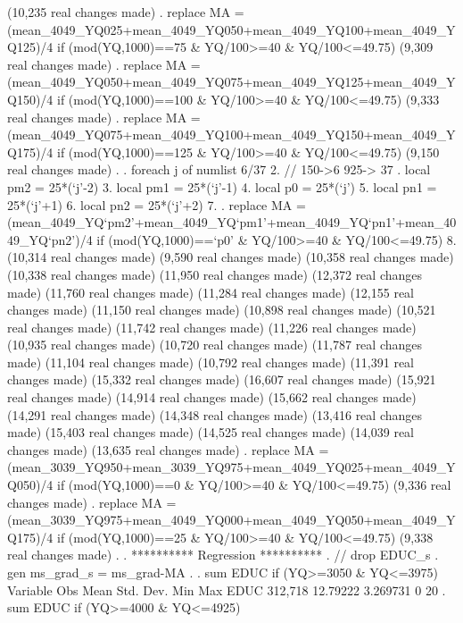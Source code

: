 (10,235 real changes made)
{\smallskip}
. replace MA = (mean_4049_YQ025+mean_4049_YQ050+mean_4049_YQ100+mean_4049_YQ125)/4 if (mod(YQ,1000)==75 \& YQ/100>=40 \& YQ/100<=49.75)
(9,309 real changes made)
{\smallskip}
. replace MA = (mean_4049_YQ050+mean_4049_YQ075+mean_4049_YQ125+mean_4049_YQ150)/4 if (mod(YQ,1000)==100 \& YQ/100>=40 \& YQ/100<=49.75)
(9,333 real changes made)
{\smallskip}
. replace MA = (mean_4049_YQ075+mean_4049_YQ100+mean_4049_YQ150+mean_4049_YQ175)/4 if (mod(YQ,1000)==125 \& YQ/100>=40 \& YQ/100<=49.75)
(9,150 real changes made)
{\smallskip}
. 
. foreach j of numlist 6/37{\lbr}
  2.         // 150->6 925-> 37
.         local pm2 = 25*(`j'-2)
  3.         local pm1 = 25*(`j'-1)
  4.         local p0 = 25*(`j')
  5.         local pn1 = 25*(`j'+1)
  6.         local pn2 = 25*(`j'+2)
  7. 
.         replace MA = (mean_4049_YQ`pm2'+mean_4049_YQ`pm1'+mean_4049_YQ`pn1'+mean_4049_YQ`pn2')/4 if (mod(YQ,1000)==`p0' \& YQ/100>=40 \& YQ/100<=49.75)
  8. {\rbr}
(10,314 real changes made)
(9,590 real changes made)
(10,358 real changes made)
(10,338 real changes made)
(11,950 real changes made)
(12,372 real changes made)
(11,760 real changes made)
(11,284 real changes made)
(12,155 real changes made)
(11,150 real changes made)
(10,898 real changes made)
(10,521 real changes made)
(11,742 real changes made)
(11,226 real changes made)
(10,935 real changes made)
(10,720 real changes made)
(11,787 real changes made)
(11,104 real changes made)
(10,792 real changes made)
(11,391 real changes made)
(15,332 real changes made)
(16,607 real changes made)
(15,921 real changes made)
(14,914 real changes made)
(15,662 real changes made)
(14,291 real changes made)
(14,348 real changes made)
(13,416 real changes made)
(15,403 real changes made)
(14,525 real changes made)
(14,039 real changes made)
(13,635 real changes made)
{\smallskip}
. replace MA = (mean_3039_YQ950+mean_3039_YQ975+mean_4049_YQ025+mean_4049_YQ050)/4 if (mod(YQ,1000)==0 \& YQ/100>=40 \& YQ/100<=49.75)
(9,336 real changes made)
{\smallskip}
. replace MA = (mean_3039_YQ975+mean_4049_YQ000+mean_4049_YQ050+mean_4049_YQ175)/4 if (mod(YQ,1000)==25 \& YQ/100>=40 \& YQ/100<=49.75)
(9,338 real changes made)
{\smallskip}
. 
. **********  Regression **********
. // drop EDUC_s
. gen ms_grad_s = ms_grad-MA
{\smallskip}
. 
. sum EDUC if (YQ>=3050 \& YQ<=3975)
{\smallskip}
    Variable {\VBAR}        Obs        Mean    Std. Dev.       Min        Max
        EDUC {\VBAR}    312,718    12.79222    3.269731          0         20
{\smallskip}
. sum EDUC if (YQ>=4000 \& YQ<=4925)
{\smallskip}
